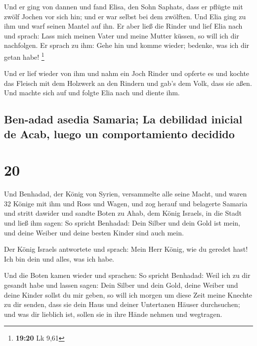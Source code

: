  Und er ging von dannen und fand Elisa, den Sohn Saphats,
dass er pflügte mit zwölf Jochen vor sich hin; und er war selbst bei dem
zwölften. Und Elia ging zu ihm und warf seinen Mantel auf ihn.
 Er aber ließ die Rinder und lief Elia nach und sprach:
Lass mich meinen Vater und meine Mutter küssen, so will ich dir
nachfolgen. Er sprach zu ihm: Gehe hin und komme wieder; bedenke, was
ich dir getan habe! \footnote{\textbf{19:20} Lk 9,61}

 Und er lief wieder von ihm und nahm ein Joch Rinder und
opferte es und kochte das Fleisch mit dem Holzwerk an den Rindern und
gab's dem Volk, dass sie aßen. Und machte sich auf und folgte Elia nach
und diente ihm.

\hypertarget{ben-adad-asedia-samaria-la-debilidad-inicial-de-acab-luego-un-comportamiento-decidido}{%
\subsection{Ben-adad asedia Samaria; La debilidad inicial de Acab, luego
un comportamiento
decidido}\label{ben-adad-asedia-samaria-la-debilidad-inicial-de-acab-luego-un-comportamiento-decidido}}

\hypertarget{section-19}{%
\section{20}\label{section-19}}

 Und Benhadad, der König von Syrien, versammelte alle
seine Macht, und waren 32 Könige mit ihm und Ross und Wagen, und zog
herauf und belagerte Samaria und stritt dawider  und
sandte Boten zu Ahab, dem König Israels, in die Stadt  und
ließ ihm sagen: So spricht Benhadad: Dein Silber und dein Gold ist mein,
und deine Weiber und deine besten Kinder sind auch mein.

 Der König Israels antwortete und sprach: Mein Herr König,
wie du geredet hast! Ich bin dein und alles, was ich habe.

 Und die Boten kamen wieder und sprachen: So spricht
Benhadad: Weil ich zu dir gesandt habe und lassen sagen: Dein Silber und
dein Gold, deine Weiber und deine Kinder sollst du mir geben,
 so will ich morgen um diese Zeit meine Knechte zu dir
senden, dass sie dein Haus und deiner Untertanen Häuser durchsuchen; und
was dir lieblich ist, sollen sie in ihre Hände nehmen und wegtragen.

